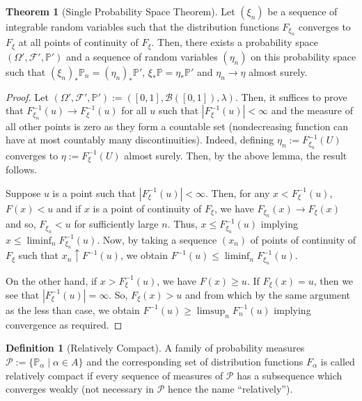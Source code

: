 \documentclass[]{article}
\theoremstyle{definition}
\newtheorem{theorem}{Theorem}
\theoremstyle{definition}
\newtheorem{definition}{Definition}[section]
\begin{document}
\begin{theorem}[Single Probability Space Theorem]
  Let \((\xi_n)\) be a sequence of integrable random variables such that the 
  distribution functions \(F_{\xi_n}\) converges to \(F_\xi\) at all 
  points of continuity of \(F_\xi\). Then, there exists a probability space 
  \((\Omega', \mathcal{F}', \mathbb{P}')\) and a sequence of random variables 
  \((\eta_n)\) on this probability space such that 
  \((\xi_n)_*\mathbb{P}_n = (\eta_n)_*\mathbb{P}'\), 
  \(\xi_*\mathbb{P} = \eta_* \mathbb{P}'\) and \(\eta_n \to \eta\) 
  almost surely.
\end{theorem}
\begin{proof}
  Let \((\Omega', \mathcal{F}', \mathbb{P}') := ([0, 1], \mathcal{B}([0, 1]), \lambda)\).
  Then, it suffices to prove that \(F_{\xi_n}^{-1}(u) \to F_\xi^{-1}(u)\) for all 
  \(u\) such that \(|F_\xi^{-1}(u)| < \infty\) and the measure of all other points 
  is zero as they form a countable set (nondecreasing function can have at most 
  countably many discontinuities). Indeed, defining \(\eta_n := F_{\xi_n}^{-1}(U)\) 
  converges to \(\eta := F_\xi^{-1}(U)\) almost surely. Then, by the above lemma, 
  the result follows. 

  Suppose \(u\) is a point such that \(|F_\xi^{-1}(u)| < \infty\). Then, for any 
  \(x < F_\xi^{-1}(u)\), \(F(x) < u\) and if \(x\) is a point of continuity 
  of \(F_\xi\), we have \(F_{\xi_n}(x) \to F_\xi(x)\) and so, \(F_{\xi_n}< u\) 
  for sufficiently large \(n\). Thus, \(x \le F_{\xi_n}^{-1}(u)\) implying 
  \(x \le \liminf_n F_{\xi_n}^{-1}(u)\). Now, by taking a sequence \((x_n)\) 
  of points of continuity of \(F_\xi\) such that \(x_n \uparrow F^{-1}(u)\), 
  we obtain \(F^{-1}(u) \le \liminf_n F_{\xi_n}^{-1}(u)\).

  On the other hand, if \(x > F_\xi^{-1}(u)\), we have \(F(x) \ge u\). 
  If \(F_\xi(x) = u\), then we see that \(|F_{\xi}^{-1}(u)| = \infty\). 
  So, \(F_\xi(x) > u\) and from which by the same argument as the less 
  than case, we obtain \(F^{-1}(u) \ge \limsup_n F_n^{-1}(u)\) implying 
  convergence as required.
\end{proof}

\begin{definition}[Relatively Compact]
  A family of probability measures \(\mathcal{P} := 
  \{\mathbb{P}_\alpha \mid \alpha \in A\}\) and the corresponding set of distribution 
  functions \(F_\alpha\) is called relatively compact if every sequence of 
  measures of \(\mathcal{P}\) has a subsequence which converges weakly 
  (not necessary in \(\mathcal{P}\) hence the name ``relatively''). 
\end{definition}
\end{document}
